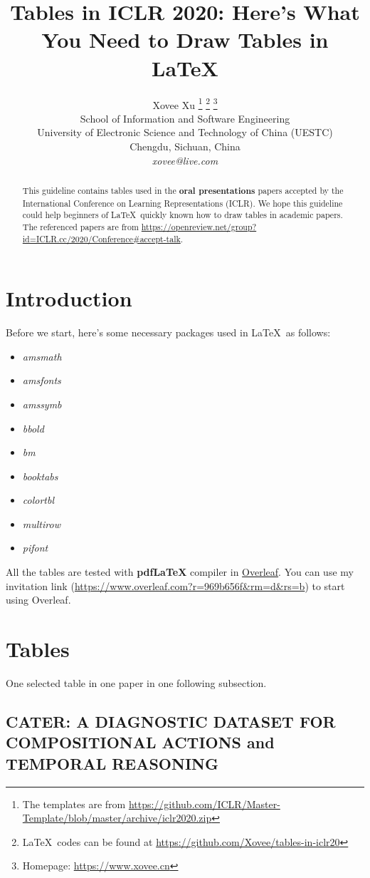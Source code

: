\documentclass{article} %
\title{Tables in ICLR 2020: Here's What You Need to Draw Tables in \LaTeX}
\author{Xovee Xu \thanks{ The templates are from \url{https://github.com/ICLR/Master-Template/blob/master/archive/iclr2020.zip}} 
\thanks{ \LaTeX~codes can be found at \url{https://github.com/Xovee/tables-in-iclr20}}
\thanks{ Homepage: \url{https://www.xovee.cn}
} \\ 
School of Information and Software Engineering\\
University of Electronic Science and Technology of China (UESTC)\\
Chengdu, Sichuan, China\\
\textit{xovee@live.com} \\
}
\begin{document}
\maketitle

\begin{abstract}
This guideline contains tables used in the \textbf{oral presentations} papers accepted by the International Conference on Learning Representations (ICLR). We hope this guideline could help beginners of \LaTeX~quickly known how to draw tables in academic papers. The referenced papers are from \url{https://openreview.net/group?id=ICLR.cc/2020/Conference#accept-talk}. 
\end{abstract}

\section{Introduction}\label{sec:introduction}

Before we start, here's some necessary packages used in \LaTeX~as follows:
\begin{itemize}
    \item \textit{amsmath}
    \item \textit{amsfonts}
    \item \textit{amssymb}
    \item \textit{bbold}
    \item \textit{bm}
    \item \textit{booktabs}
    \item \textit{colortbl}
    \item \textit{multirow}
    \item \textit{pifont}
    
\end{itemize}

All the tables are tested with \textbf{pdfLaTeX} compiler in \hyperlink{https://www.overleaf.com/}{Overleaf}. You can use my invitation link (\url{https://www.overleaf.com?r=969b656f&rm=d&rs=b}) to start using Overleaf. 

\section{Tables}\label{sec:tables}

One selected table in one paper in one following subsection. 

\subsection{CATER: A DIAGNOSTIC DATASET FOR
COMPOSITIONAL ACTIONS and TEMPORAL REASONING}
\end{document}
